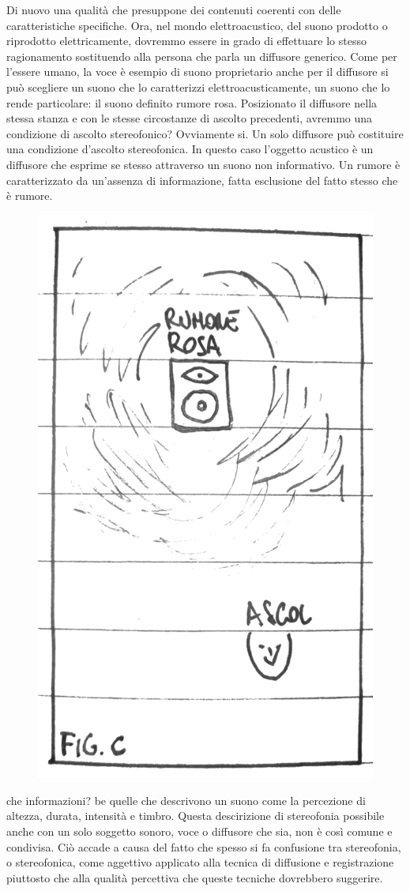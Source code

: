 Di nuovo una qualità che presuppone dei contenuti coerenti con delle
caratteristiche specifiche. Ora, nel mondo elettroacustico, del suono prodotto
o riprodotto elettricamente, dovremmo essere in grado di effettuare lo stesso
ragionamento sostituendo alla persona che parla un diffusore generico. Come per
l'essere umano, la voce è esempio di suono proprietario anche per il diffusore
si può scegliere un suono che lo caratterizzi elettroacusticamente, un suono
che lo rende particolare: il suono definito rumore rosa. Posizionato il diffusore
nella stessa stanza e con le stesse circostanze di ascolto precedenti, avremmo
una condizione di ascolto stereofonico? Ovviamente si. Un solo diffusore può
costituire una condizione d'ascolto stereofonica. In questo caso l'oggetto
acustico è un diffusore che esprime se stesso attraverso un suono non informativo.
Un rumore è caratterizzato da un'assenza di informazione, fatta esclusione del
fatto stesso che è rumore.

\begin{figure}[h]
\begin{center}
  \includegraphics[width=.48\linewidth]{CAPITOLI/1000/IMG/figc.png}
\label{ee:figa}
\end{center}
\end{figure}

che informazioni? be quelle che descrivono un suono come la percezione di altezza,
durata, intensità e timbro. Questa descirizione di stereofonia possibile anche
con un solo soggetto sonoro, voce o diffusore che sia, non è così comune e
condivisa. Ciò accade a causa del fatto che spesso si fa confusione tra stereofonia,
o stereofonica, come aggettivo applicato alla tecnica di diffusione e registrazione
piuttosto che alla qualità percettiva che queste tecniche dovrebbero suggerire.

